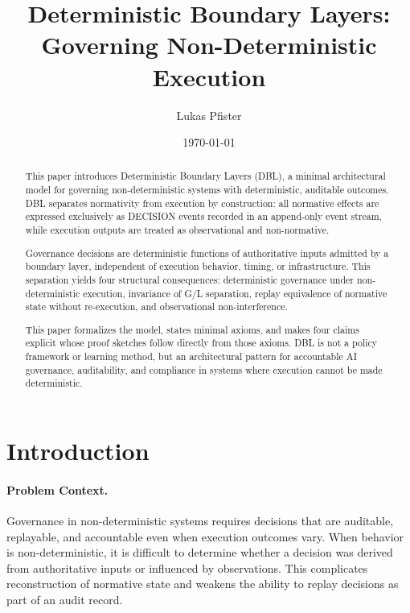 \documentclass[11pt]{article}
\title{Deterministic Boundary Layers: Governing Non-Deterministic Execution}
\author{Lukas Pfister}
\date{\today}
\begin{document}

\maketitle

\begin{abstract}
This paper introduces Deterministic Boundary Layers (DBL), a minimal architectural model
for governing non-deterministic systems with deterministic, auditable outcomes.
DBL separates normativity from execution by construction: all normative effects
are expressed exclusively as DECISION events recorded in an append-only
event stream, while execution outputs are treated as observational and non-normative.

Governance decisions are deterministic functions of authoritative inputs admitted
by a boundary layer, independent of execution behavior, timing, or infrastructure.
This separation yields four structural consequences: deterministic governance under
non-deterministic execution, invariance of G/L separation, replay equivalence of
normative state without re-execution, and observational non-interference.

This paper formalizes the model, states minimal axioms, and makes four claims
explicit whose proof sketches follow directly from those axioms. DBL is not a
policy framework or learning method, but an architectural pattern for accountable
AI governance, auditability, and compliance in systems where execution cannot be
made deterministic.
\end{abstract}

\section{Introduction}

\paragraph{Problem Context.}
Governance in non-deterministic systems requires decisions that are auditable, replayable, and accountable even when execution outcomes vary. When behavior is non-deterministic, it is difficult to determine whether a decision was derived from authoritative inputs or influenced by observations. This complicates reconstruction of normative state and weakens the ability to replay decisions as part of an audit record.
\end{document}
